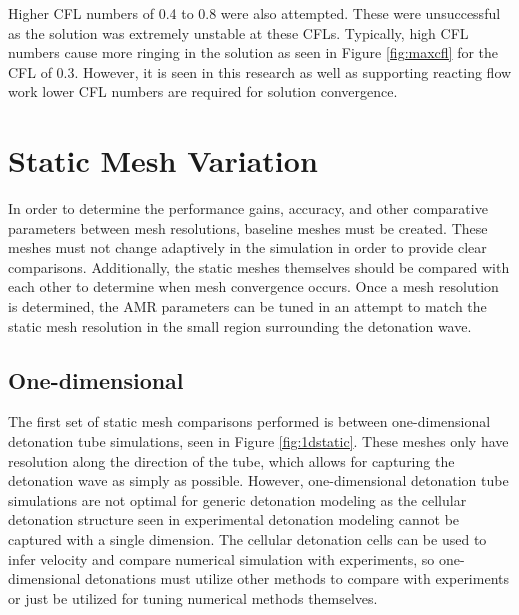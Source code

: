 Higher CFL numbers of 0.4 to 0.8 were also attempted. These were unsuccessful as the solution was extremely unstable at these CFLs. Typically, high CFL numbers cause more ringing in the solution as seen in Figure \ref{fig:maxcfl} for the CFL of 0.3. However, it is seen in this research as well as supporting reacting flow work \cite{ajaero}\cite{kim}\cite{marcantoni} lower CFL numbers are required for solution convergence. 

\section{Static Mesh Variation}
\label{sec:staticvar}
In order to determine the performance gains, accuracy, and other comparative parameters between mesh resolutions, baseline meshes must be created. These meshes must not change adaptively in the simulation in order to provide clear comparisons. Additionally, the static meshes themselves should be compared with each other to determine when mesh convergence occurs. Once a mesh resolution is determined, the AMR parameters can be tuned in an attempt to match the static mesh resolution in the small region surrounding the detonation wave. 


\subsection{One-dimensional}
\label{sec:1dstatic}

The first set of static mesh comparisons performed is between one-dimensional detonation tube simulations, seen in Figure \ref{fig:1dstatic}. These meshes only have resolution along the direction of the tube, which allows for capturing the detonation wave as simply as possible. However,  one-dimensional detonation tube simulations are not optimal for generic detonation modeling as the cellular detonation structure seen in experimental detonation modeling cannot be captured with a single dimension. The cellular detonation cells can be used to infer velocity and compare numerical simulation with experiments, so one-dimensional detonations must utilize other methods to compare with experiments or just be utilized for tuning numerical methods themselves. 

